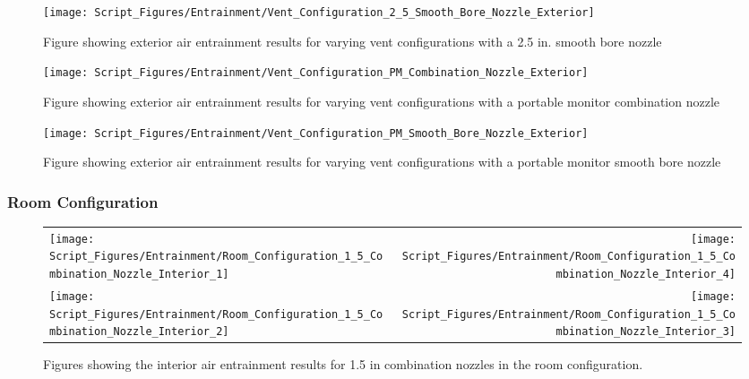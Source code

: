 \documentclass{article}
\begin{document}
\begin{appendices}
\clearpage

\begin{figure}[!ht]
\centering
\texttt{[image: Script\_Figures/Entrainment/Vent\_Configuration\_2\_5\_Smooth\_Bore\_Nozzle\_Exterior]}
\caption{Figure showing exterior air entrainment results for varying vent configurations with a 2.5 in. smooth bore nozzle}
\label{fig:2_5_Exterior_Smooth_Bore_Vent_Config}
\end{figure}

\clearpage

\begin{figure}[!ht]
\centering
\texttt{[image: Script\_Figures/Entrainment/Vent\_Configuration\_PM\_Combination\_Nozzle\_Exterior]}
\caption{Figure showing exterior air entrainment results for varying vent configurations with a portable monitor combination nozzle}
\label{fig:PM_Exterior_Combination_Vent_Config}
\end{figure}

\clearpage

\begin{figure}[!ht]
\centering
\texttt{[image: Script\_Figures/Entrainment/Vent\_Configuration\_PM\_Smooth\_Bore\_Nozzle\_Exterior]}
\caption{Figure showing exterior air entrainment results for varying vent configurations with a portable monitor smooth bore nozzle}
\label{fig:PM_Exterior_Smooth_Bore_Vent_Config}
\end{figure}

\clearpage

\subsubsection{Room Configuration}

\begin{figure}[!ht]
\begin{tabular*}{\textwidth}{lr}
\texttt{[image: Script\_Figures/Entrainment/Room\_Configuration\_1\_5\_Combination\_Nozzle\_Interior\_1]} &
\texttt{[image: Script\_Figures/Entrainment/Room\_Configuration\_1\_5\_Combination\_Nozzle\_Interior\_4]} \\
\texttt{[image: Script\_Figures/Entrainment/Room\_Configuration\_1\_5\_Combination\_Nozzle\_Interior\_2]} &
\texttt{[image: Script\_Figures/Entrainment/Room\_Configuration\_1\_5\_Combination\_Nozzle\_Interior\_3]} \\
\end{tabular*}
\caption{Figures showing the interior air entrainment results for 1.5 in combination nozzles in the room configuration.}
\label{fig:1_5_Interior_Combination_Room_Config}
\end{figure}


\end{appendices}
\end{document}
